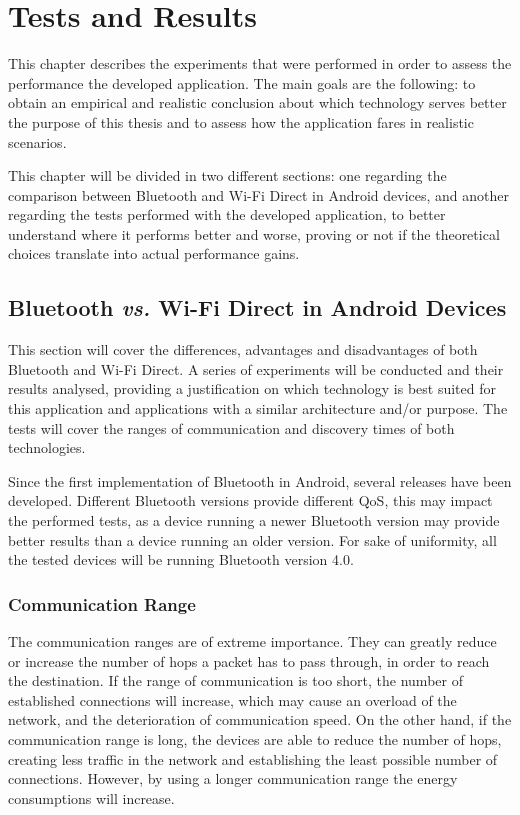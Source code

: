 \chapter{Tests and Results}
\label{chapter:tests}

This chapter describes the experiments that were performed in order to assess the performance the developed application. The main goals are the following: to obtain an empirical and realistic conclusion about which technology serves better the purpose of this thesis and to assess how the application fares in realistic scenarios.

This chapter will be divided in two different sections: one regarding the comparison between Bluetooth and Wi-Fi Direct in Android devices, and another regarding the tests performed with the developed application, to better understand where it performs better and worse, proving or not if the theoretical choices translate into actual performance gains.

\section{Bluetooth \textit{vs.} Wi-Fi Direct in Android Devices}
\label{sec:btvswifitests}

This section will cover the differences, advantages and disadvantages of both Bluetooth and Wi-Fi Direct. A series of experiments will be conducted and their results analysed, providing a justification on which technology is best suited for this application and applications with a similar architecture and/or purpose. The tests will cover the ranges of communication and discovery times of both technologies.

Since the first implementation of Bluetooth in Android, several releases have been developed. Different Bluetooth versions provide different \gls{QoS}, this may impact the performed tests, as a device running a newer Bluetooth version may provide better results than a device running an older version. For sake of uniformity, all the tested devices will be running Bluetooth version 4.0.

\subsection{Communication Range}
\label{subsec:ranges}

The communication ranges are of extreme importance. They can greatly reduce or increase the number of hops a packet has to pass through, in order to reach the destination. If the range of communication is too short, the number of established connections will increase, which may cause an overload of the network, and the deterioration of communication speed. On the other hand, if the communication range is long, the devices are able to reduce the number of hops, creating less traffic in the network and establishing the least possible number of connections. However, by using a longer communication range the energy consumptions will increase.

